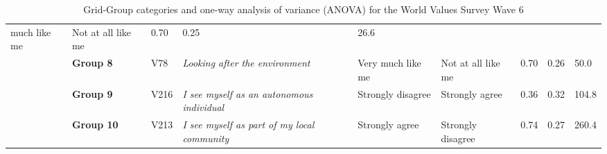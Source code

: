 \begin{sidewaystable}[]
\begin{adjustbox}{width=\paperwidth}
\begin{tabular}[]{p{}lp{}p{}lllll}
much like me & Not at all like me & 0.70 & 0.25 & 26.6\tabularnewline
& \textbf{Group 8} & V78 & \emph{Looking after the environment} & Very
much like me & Not at all like me & 0.70 & 0.26 & 50.0\tabularnewline
& \textbf{Group 9} & V216 & \emph{I see myself as an autonomous
individual} & Strongly disagree & Strongly agree & 0.36 & 0.32 &
104.8\tabularnewline
& \textbf{Group 10} & V213 & \emph{I see myself as part of my local
community} & Strongly agree & Strongly disagree & 0.74 & 0.27 &
260.4\tabularnewline
\bottomrule
\end{tabular}
\end{adjustbox}
\caption{Grid-Group categories and one-way analysis of variance (ANOVA) for the World Values Survey Wave 6}
\label{table: WVS grid-group questions}
\end{sidewaystable}



